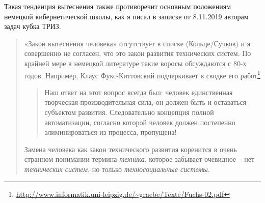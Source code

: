 \documentclass[11pt,a4paper]{article}
\begin{document}
Такая тенденция вытеснения также противоречит основным положениям немецкой
кибернетической школы, как я писал в записке от 8.11.2019 авторам задач кубка
ТРИЗ.
\begin{quote}
  «Закон вытеснения человека» отсутствует в списке (Кольце/Сучков) и я
  совершенно не согласен, что это закон развития технических систем. По
  крайней мере в немецкой литературе такие воросы обсуждаются с 80-х годов.
  Например, Клаус Фукс-Киттовский подчеркивает в сводке его
  работ\footnote{\url{http://www.informatik.uni-leipzig.de/~graebe/Texte/Fuchs-02.pdf}}
  \begin{quote}
    Наш ответ на этот вопрос всегда был: человек единственная творческая
    производительная сила, он должен быть и оставаться субъектом
    развития. Следовательно концепция полной автоматизации, согласно которой
    человек должен постепенно элиминироваться из процесса, пропущена!
  \end{quote}  
  Замена человека как закон технического развития коренится в очень странном
  понимании термина \emph{техника}, которое забывает очевидное -- нет
  \emph{технических систем}, но только \emph{техносоциальные системы}.
\end{quote}
\end{document}
